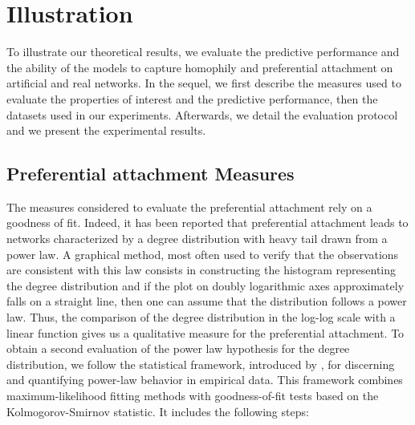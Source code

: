 \section{Illustration}

To illustrate our theoretical results, we evaluate the predictive performance and the ability of the models to capture homophily and preferential attachment on artificial and real networks. In the sequel, we first describe the measures used to evaluate the properties of interest and the predictive performance, then the datasets used in our experiments. Afterwards, we detail the evaluation protocol and we present the experimental results.


\subsection{Preferential attachment Measures}
\label{sec:experiments-burst}

The measures considered to evaluate the preferential attachment rely on a goodness of fit. Indeed, it has been reported that preferential attachment leads to networks characterized by a degree distribution with heavy tail drawn from a power law. A graphical method, most often used to verify that the observations are consistent with this law  consists in constructing the histogram representing the degree distribution and if the plot on doubly logarithmic axes approximately falls on a straight line, then one can assume that the distribution follows a power law. Thus, the comparison of the degree distribution in the log-log scale with a linear function gives us a qualitative measure for the preferential attachment. To obtain a second evaluation of the power law hypothesis for the degree distribution, we follow the statistical framework, introduced by \cite{clauset2009power}, for discerning and quantifying power-law behavior in empirical data. This framework combines maximum-likelihood fitting methods with goodness-of-fit tests based on the Kolmogorov-Smirnov statistic. It includes the following steps:


